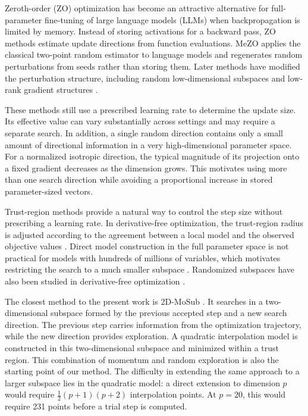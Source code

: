 \documentclass{siamart171218}
\begin{document}
Zeroth-order (ZO) optimization has become an attractive alternative for full-parameter fine-tuning of large language models (LLMs) when backpropagation is limited by memory. Instead of storing activations for a backward pass, ZO methods estimate update directions from function evaluations. MeZO \cite{malladi2023mezo} applies the classical two-point random estimator \cite{nesterov2017random} to language models and regenerates random perturbations from seeds rather than storing them. Later methods have modified the perturbation structure, including random low-dimensional subspaces \cite{yu2024subzero} and low-rank gradient structures \cite{chen2024enhancing}.

These methods still use a prescribed learning rate to determine the update size. Its effective value can vary substantially across settings and may require a separate search. In addition, a single random direction contains only a small amount of directional information in a very high-dimensional parameter space. For a normalized isotropic direction, the typical magnitude of its projection onto a fixed gradient decreases as the dimension grows. This motivates using more than one search direction while avoiding a proportional increase in stored parameter-sized vectors.

Trust-region methods provide a natural way to control the step size without prescribing a learning rate. In derivative-free optimization, the trust-region radius is adjusted according to the agreement between a local model and the observed objective values \cite{audet2017derivative, conn2009introduction, conn2000trust, Conn2009a}. Direct model construction in the full parameter space is not practical for models with hundreds of millions of variables, which motivates restricting the search to a much smaller subspace \cite{cartis2023scalable, yuan2007subspace, yuan2014review}. Randomized subspaces have also been studied in derivative-free optimization \cite{cartis2024randomizedsubspacederivativefreeoptimization, kozak2021stochastic, Menickelly2023}.

The closest method to the present work is 2D-MoSub \cite{xie2023twodimensional}. It searches in a two-dimensional subspace formed by the previous accepted step and a new search direction. The previous step carries information from the optimization trajectory, while the new direction provides exploration. A quadratic interpolation model is constructed in this two-dimensional subspace and minimized within a trust region. This combination of momentum and random exploration is also the starting point of our method. The difficulty in extending the same approach to a larger subspace lies in the quadratic model: a direct extension to dimension $p$ would require $\frac{1}{2}(p+1)(p+2)$ interpolation points. At $p=20$, this would require 231 points before a trial step is computed.
\end{document}

